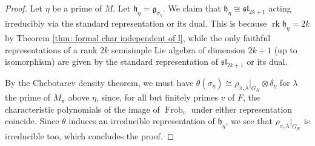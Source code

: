 \documentclass{amsart}
\theoremstyle{definition}
\numberwithin{equation}{section} %
\newcommand{\sllie}{\mathfrak{sl}}
\newcommand{\rk}{\operatorname{rk}}
\newcommand{\Frob}{\operatorname{Frob}}
\newcommand{\mf}[1]{\mathfrak{#1}}
\begin{document}
\begin{proof}
Let $\eta$ be a prime of $M$.
Let $\mf{h}_\eta = \mf{g}_{\sigma_\eta}$.
We claim that $\mf{h}_\eta \cong \sllie_{2k+1}$ acting irreducibly via the standard representation or its dual.
This is because $\rk \mf{h}_\eta = 2k$ by Theorem \ref{thm: formal char independent of l}, while the only faithful representations of a rank $2k$ semisimple Lie algebra of dimension $2k+1$  (up to isomorphism) are given by the standard representation of $\sllie_{2k+1}$ or its dual.

By the Chebotarev density theorem, we must have $\theta(\sigma_\eta) \cong \rho_{\pi,\lambda}|_{G_K} \otimes \delta_\eta$ for $\lambda$ the prime of $M_\pi$ above $\eta$, since, for all but finitely primes $v$ of $F$, the characteristic polynomials of the image of $\Frob_v$ under either representation coincide. 
Since $\theta$ induces an irreducible representation of $\mf{h}_\eta$, we see that $\rho_{\pi,\lambda}|_{G_K}$ is irreducible too, which concludes the proof.
\end{proof}
\end{document}
